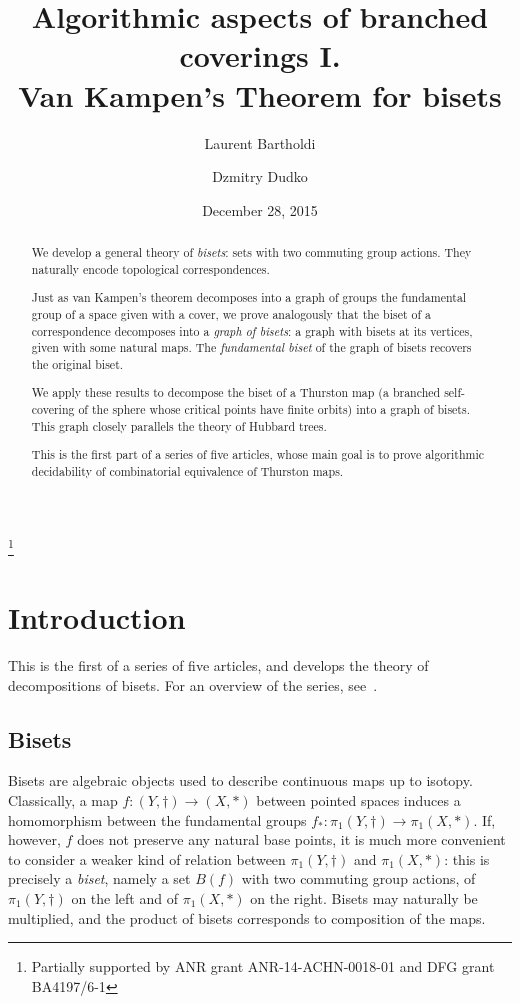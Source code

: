 \documentclass{amsart}
\begin{document}
\title[Van Kampen's Theorem for bisets]{Algorithmic aspects of branched coverings I.\\ Van Kampen's Theorem for bisets}
\author{Laurent Bartholdi}
\author{Dzmitry Dudko}
\address{\'Ecole Normale Sup\'erieure, Paris \emph{and} Mathematisches Institut, Georg-August Universit\"at zu G\"ottingen}
\thanks{Partially supported by ANR grant ANR-14-ACHN-0018-01 and DFG grant BA4197/6-1}
\date{December 28, 2015}
\begin{abstract}
  We develop a general theory of \emph{bisets}: sets with two
  commuting group actions. They naturally encode topological
  correspondences.

  Just as van Kampen's theorem decomposes into a graph of groups the
  fundamental group of a space given with a cover, we prove
  analogously that the biset of a correspondence decomposes into a
  \emph{graph of bisets}: a graph with bisets at its vertices, given
  with some natural maps. The \emph{fundamental biset} of the graph of
  bisets recovers the original biset.

  We apply these results to decompose the biset of a Thurston map (a
  branched self-covering of the sphere whose critical points have
  finite orbits) into a graph of bisets. This graph closely parallels
  the theory of Hubbard trees.

  This is the first part of a series of five articles, whose main goal
  is to prove algorithmic decidability of combinatorial equivalence of
  Thurston maps.
\end{abstract}
\maketitle

\section{Introduction}
This is the first of a series of five articles, and develops the theory of
decompositions of bisets. For an overview of the series,
see~\cite{bartholdi-dudko:bc0}.

\subsection{Bisets}
Bisets are algebraic objects used to describe continuous maps up to
isotopy. Classically, a map $f\colon(Y,\dagger)\to(X,*)$ between pointed
spaces induces a homomorphism between the fundamental groups
$f_*\colon\pi_1(Y,\dagger)\to\pi_1(X,*)$. If, however, $f$ does not
preserve any natural base points, it is much more convenient to consider a
weaker kind of relation between $\pi_1(Y,\dagger)$ and $\pi_1(X,*)$: this
is precisely a \emph{biset}, namely a set $B(f)$ with two commuting group
actions, of $\pi_1(Y,\dagger)$ on the left and of $\pi_1(X,*)$ on the
right. Bisets may naturally be multiplied, and the product of bisets
corresponds to composition of the maps.
\end{document}
